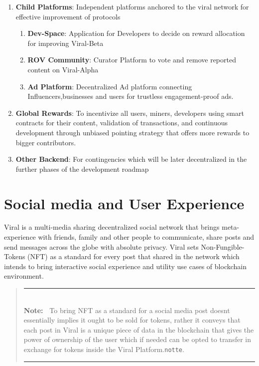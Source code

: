 \documentclass[10pt]{article}
\newlength{\Lnote}
\newcommand{\notte}[1]
     {\addtolength{\leftmargini}{1em}
        \settowidth{\Lnote}{\textbf{Note:~}}
        \begin{quote}
            \rule{\dimexpr\textwidth-2\leftmargini}{1pt}\\
                        \mbox{}\hspace{-\Lnote}\textbf{Note:~}%
                                            #1\\[-0.5ex] 
            \rule{\dimexpr\textwidth-2\leftmargini}{1pt}
        \end{quote}
        \addtolength{\leftmargini}{-4em}}
\begin{document}
\begin{enumerate}
\item \textbf{Child Platforms}: Independent platforms anchored to the viral network for effective improvement of protocols

\begin{enumerate}

\item \textbf{Dev-Space}: Application for Developers to decide on reward allocation for improving Viral-Beta
\item \textbf{ROV Community}: Curator Platform to vote and remove reported content on Viral-Alpha
\item \textbf{Ad Platform}: Decentralized Ad platform connecting Influencers,businesses and users for trustless engagement-proof ads.

\end{enumerate}

\item \textbf{Global Rewards}: To incentivize all users, miners, developers using smart contracts for their content, validation of transactions, and continuous development through unbiased pointing strategy that offers more rewards to bigger contributors.


\item \textbf{Other Backend}: For contingencies which will be later decentralized in the further phases of the development roadmap

	

\end{enumerate}

\newpage

\section{Social media and User Experience}
Viral is a multi-media sharing decentralized social network that brings meta-experience with friends, family and other people to communicate, share posts and send messages across the globe with absolute privacy. Viral sets Non-Fungible-Tokens (NFT) as a standard for every post that shared in the network which intends to bring interactive social experience and utility use cases of blockchain environment.\\

\notte{To bring NFT as a standard for a social media post doesn\textsc{\char13}t essentially implies it ought to be sold for tokens, rather it conveys that each post in Viral is a unique piece of data in the blockchain that gives the power of ownership of the user which if needed can be opted to transfer in exchange for tokens inside the Viral Platform.\texttt{notte}.}
\end{document}
